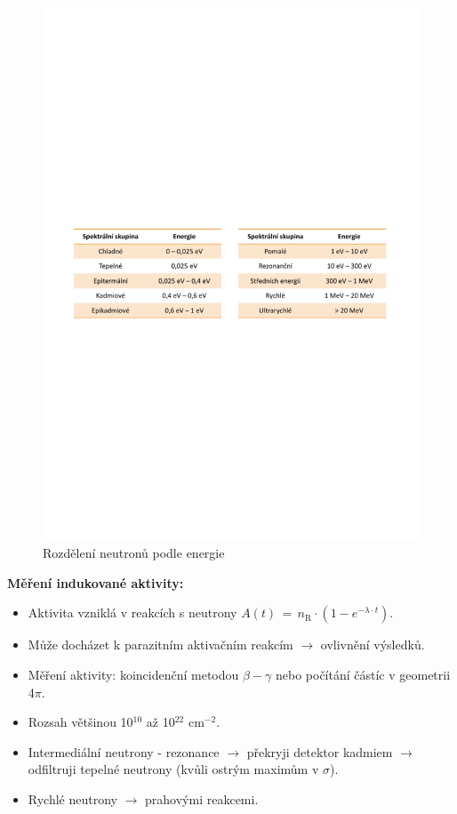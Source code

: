 \begin{figure}[H]
    \centering
    \includegraphics[width=0.8\linewidth, trim={1cm 12cm 1cm 12cm}, clip]{img/neutrony_energie.pdf}
    \caption{Rozdělení neutronů podle energie}
\end{figure}

\textbf{Měření indukované aktivity:}

\begin{itemize}
    \item Aktivita vzniklá v reakcích s neutrony $A(t)\,=\,n_{\text{R}} \cdot (1 - e^{-\lambda \cdot t})$.
    \item Může docházet k parazitním aktivačním reakcím $\rightarrow$ ovlivnění výsledků.
    \item Měření aktivity: koincidenční metodou $\beta-\gamma$ nebo počítání částíc v geometrii 4$\pi$.
    \item Rozsah většinou 10$^{10}$ až 10$^{22}$ cm$^{-2}$.
    \item Intermediální neutrony - rezonance $\rightarrow$ překryji detektor kadmiem $\rightarrow$ odfiltruji tepelné neutrony (kvůli ostrým maximům v $\sigma$).
    \item Rychlé neutrony $\rightarrow$ prahovými reakcemi.
\end{itemize}

